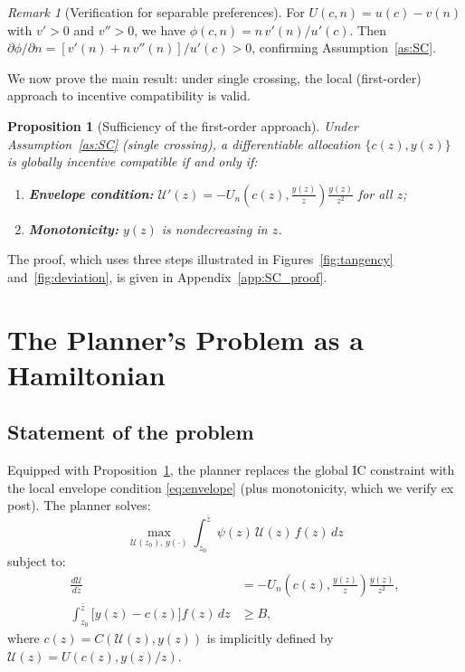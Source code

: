 \documentclass[12pt,a4paper]{article}
\theoremstyle{definition}
\theoremstyle{plain}
\newtheorem{proposition}{Proposition}[section]
\theoremstyle{remark}
\newtheorem{remark}{Remark}[section]
\newcommand{\zbar}{\bar{z}}
\newcommand{\zlow}{z_{\scriptscriptstyle 0}}
\newcommand{\calU}{\mathcal{U}}
\begin{document}
\begin{remark}[Verification for separable preferences]
For $U(c,n) = u(c) - v(n)$ with $v' > 0$ and $v'' > 0$, we have $\phi(c,n) = n\,v'(n)/u'(c)$. Then $\partial \phi / \partial n = [v'(n) + n\,v''(n)]/u'(c) > 0$, confirming Assumption~\ref{as:SC}.
\end{remark}

We now prove the main result: under single crossing, the local (first-order) approach to incentive compatibility is valid.

\begin{proposition}[Sufficiency of the first-order approach]
\label{prop:SC}
Under Assumption~\ref{as:SC} (single crossing), a differentiable allocation $\{c(z), y(z)\}$ is globally incentive compatible if and only if:
\begin{enumerate}[label=(\roman*)]
  \item \textbf{Envelope condition:} $\calU'(z) = -U_n\!\left(c(z), \frac{y(z)}{z}\right)\frac{y(z)}{z^2}$ for all $z$;
  \item \textbf{Monotonicity:} $y(z)$ is nondecreasing in $z$.
\end{enumerate}
\end{proposition}

The proof, which uses three steps illustrated in Figures~\ref{fig:tangency} and~\ref{fig:deviation}, is given in Appendix~\ref{app:SC_proof}.


\section{The Planner's Problem as a Hamiltonian}
\label{sec:hamiltonian}

\subsection{Statement of the problem}

Equipped with Proposition~\ref{prop:SC}, the planner replaces the global IC constraint with the local envelope condition \eqref{eq:envelope} (plus monotonicity, which we verify ex post). The planner solves:
\begin{equation}
\label{eq:planner}
  \max_{\calU(\zlow),\, y(\cdot)} \int_{\zlow}^{\zbar} \psi(z) \, \calU(z) \, f(z) \, dz
\end{equation}
subject to:
\begin{align}
  \frac{d\calU}{dz} &= -U_n\!\left(c(z), \frac{y(z)}{z}\right) \frac{y(z)}{z^2},
  \label{eq:IC_law} \\[4pt]
  \int_{\zlow}^{\zbar} \bigl[ y(z) - c(z) \bigr] f(z) \, dz &\geq B,
  \label{eq:RC}
\end{align}
where $c(z) = C(\calU(z), y(z))$ is implicitly defined by $\calU(z) = U(c(z), y(z)/z)$.
\end{document}
